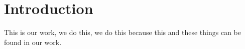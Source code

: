 \chapter{Introduction}\label{ch:introduction}

This is our work, we do this, we do this because this and these things can be found in our work.